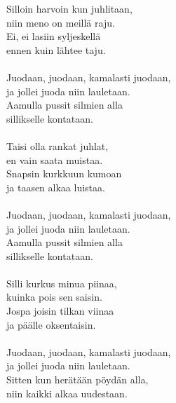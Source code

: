 
            Silloin harvoin kun juhlitaan, \\
            niin meno on meillä raju. \\
            Ei, ei lasiin syljeskellä \\
            ennen kuin lähtee taju. \\
\hspace{10mm} \\
            Juodaan, juodaan, kamalasti juodaan, \\
            ja jollei juoda niin lauletaan. \\
            Aamulla pussit silmien alla \\
            sillikselle kontataan. \\
\hspace{10mm} \\
            Taisi olla rankat juhlat, \\
            en vain saata muistaa. \\
            Snapsin kurkkuun kumoan \\
            ja taasen alkaa luistaa. \\
\hspace{10mm} \\
            Juodaan, juodaan, kamalasti juodaan, \\
            ja jollei juoda niin lauletaan. \\
            Aamulla pussit silmien alla \\
            sillikselle kontataan. \\
\hspace{10mm} \\
            Silli kurkus minua piinaa, \\
            kuinka pois sen saisin. \\
            Jospa joisin tilkan viinaa \\
            ja päälle oksentaisin. \\
\hspace{10mm} \\
            Juodaan, juodaan, kamalasti juodaan, \\
            ja jollei juoda niin lauletaan. \\
            Sitten kun herätään pöydän alla, \\
            niin kaikki alkaa uudestaan. \\
